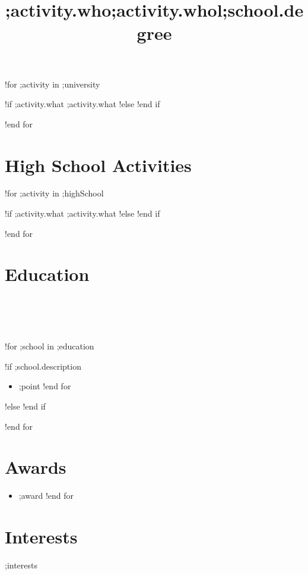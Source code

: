 \documentclass[margin,line]{res}
\begin{document}
\begin{sloppypar}
\begin{resume}
!for ;activity in ;university
    \title{\textbf{;activity.who}}
    \begin{position}
        !if ;activity.what
            ;activity.what
        !else
            \vspace{-0.5cm}
        !end if
    \end{position}
!end for


\section {High School Activities}

!for ;activity in ;highSchool
    \title{\textbf{;activity.who}}
    \begin{position}
        !if ;activity.what
            ;activity.what
        !else
            \vspace{-0.5cm}
        !end if
    \end{position}
!end for


\section{Education}

\begin{format}
  \title{l}\\
  \\
  \body\\
\end{format}

!for ;school in ;education
    \title{\textbf{;school.degree}}
    \begin{position}
        \vspace{-.3cm}
        !if ;school.description
            \begin{itemize}
            !for ;point in ;school.description
                \item ;point
            !end for
            \end{itemize}
        !else
            \vspace{-.2cm}
        !end if
    \end{position}
!end for


\section{Awards}
\begin{itemize}
    !for ;award in ;awards
        \item ;award
    !end for
\end{itemize}


\section{Interests}
;interests

\vfill


\end{resume}
\end{sloppypar}
\end{document}
